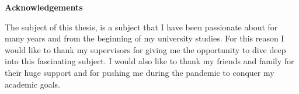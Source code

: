\pagestyle{empty}
{\textbf{Αcknowledgements}\\[1cm]}

The subject of this thesis, is a subject that I have been passionate about for many years and from the beginning of my university studies. For this reason 
I would like to thank my supervisors for giving me the opportunity to dive deep into this fascinating subject. I would also like to thank my friends and 
family for their huge support and for pushing me during the pandemic to conquer my academic goals.
